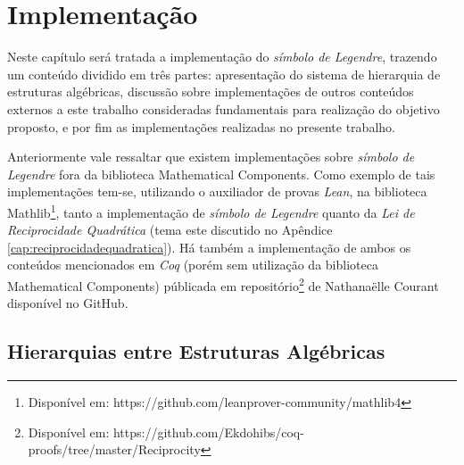 \chapter{Implementação}
\label{cap:implementacao}

Neste capítulo será tratada a implementação do \textit{símbolo de Legendre}, trazendo um conteúdo dividido em três partes: apresentação do sistema de hierarquia de estruturas algébricas, discussão sobre implementações de outros conteúdos externos a este trabalho consideradas fundamentais para realização do objetivo proposto, e por fim as implementações realizadas no presente trabalho.
        
Anteriormente vale ressaltar que existem implementações sobre \textit{símbolo de Legendre} fora da biblioteca Mathematical Components. Como exemplo de tais implementações tem-se, utilizando o auxiliador de provas \textit{Lean}, na biblioteca Mathlib\footnote{Disponível em: https://github.com/leanprover-community/mathlib4}, tanto a implementação de \textit{símbolo de Legendre} quanto da \textit{Lei de Reciprocidade Quadrática}
(tema este discutido no Apêndice \ref{cap:reciprocidadequadratica}). Há também a implementação de ambos os conteúdos mencionados em \textit{Coq} (porém sem utilização da biblioteca Mathematical Components) públicada em repositório\footnote{Disponível em: https://github.com/Ekdohibs/coq-proofs/tree/master/Reciprocity} de Nathanaëlle Courant disponível no GitHub.

\section{Hierarquias entre Estruturas Algébricas}


